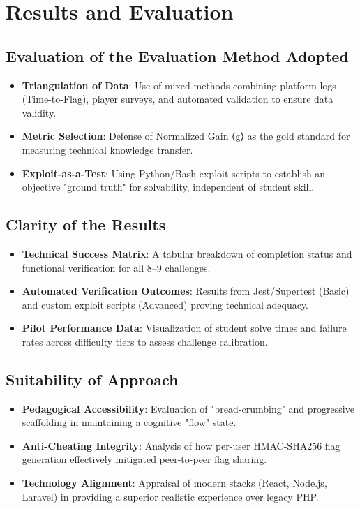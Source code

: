 \section{Results and Evaluation}
\subsection{Evaluation of the Evaluation Method Adopted}
\begin{itemize}
\item \textbf{Triangulation of Data}: Use of mixed-methods combining platform logs (Time-to-Flag), player surveys, and automated validation to ensure data validity.
\item \textbf{Metric Selection}: Defense of Normalized Gain ⟨g⟩ as the gold standard for measuring technical knowledge transfer.
\item \textbf{Exploit-as-a-Test}: Using Python/Bash exploit scripts to establish an objective "ground truth" for solvability, independent of student skill.
\end{itemize}

\subsection{Clarity of the Results}
\begin{itemize}
\item \textbf{Technical Success Matrix}: A tabular breakdown of completion status and functional verification for all 8--9 challenges.
\item \textbf{Automated Verification Outcomes}: Results from Jest/Supertest (Basic) and custom exploit scripts (Advanced) proving technical adequacy.
\item \textbf{Pilot Performance Data}: Visualization of student solve times and failure rates across difficulty tiers to assess challenge calibration.
\end{itemize}

\subsection{Suitability of Approach}
\begin{itemize}
\item \textbf{Pedagogical Accessibility}: Evaluation of "bread-crumbing" and progressive scaffolding in maintaining a cognitive "flow" state.
\item \textbf{Anti-Cheating Integrity}: Analysis of how per-user HMAC-SHA256 flag generation effectively mitigated peer-to-peer flag sharing.
\item \textbf{Technology Alignment}: Appraisal of modern stacks (React, Node.js, Laravel) in providing a superior realistic experience over legacy PHP.
\end{itemize}

